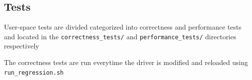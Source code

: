 \subsection*{Tests}
User-space tests are divided categorized into correctness and performance tests and located in the \texttt{correctness\_tests/} and \texttt{performance\_tests/} directories respectively

The correctness tests are run everytime the driver is modified and reloaded using  \texttt{run\_regression.sh}